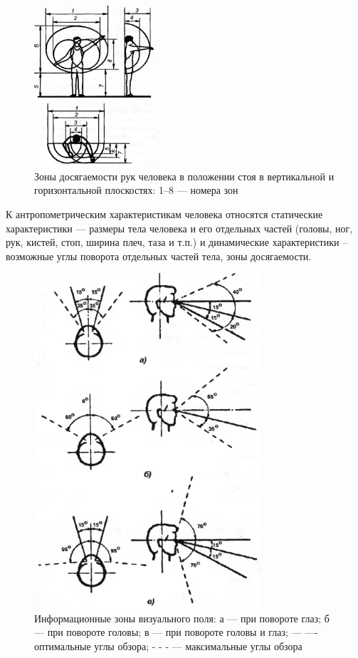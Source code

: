 \begin{figure}
  \centering
  \includegraphics[width=0.4\textwidth]{images/devisilov-6-6}
  \caption{Зоны досягаемости рук человека в положении стоя в вертикальной и горизонтальной плоскостях: 1--8 --- номера зон\label{access-zones}}
\end{figure}

К антропометрическим характеристикам человека относятся статические характеристики --- размеры тела человека и его отдельных частей (головы, ног, рук, кистей, стоп, ширина плеч, таза и т.п.) и динамические характеристики -- возможные углы поворота отдельных частей тела, зоны досягаемости.\cite{devisilov09}

\begin{figure}
  \centering
  \includegraphics[width=0.75\textwidth]{images/devisilov-6-7}
  \caption{Информационные зоны визуального поля: а --- при повороте глаз; б --- при повороте головы; в --- при повороте головы и глаз; --- ---- оптимальные углы обзора; - - - --- максимальные углы обзора\label{visual-zones}}
\end{figure}

